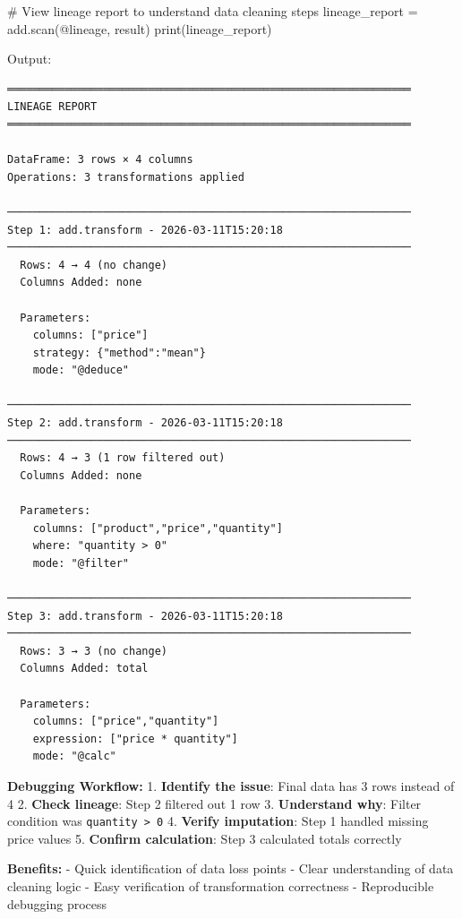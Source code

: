 \documentclass[
  letterpaper,
]{scrbook}
\newenvironment{Shaded}{\begin{snugshade}}{\end{snugshade}}
\newcommand{\BuiltInTok}[1]{\textcolor[rgb]{0.00,0.23,0.31}{#1}}
\newcommand{\CommentTok}[1]{\textcolor[rgb]{0.37,0.37,0.37}{#1}}
\newcommand{\NormalTok}[1]{\textcolor[rgb]{0.00,0.23,0.31}{#1}}
\newcommand{\OperatorTok}[1]{\textcolor[rgb]{0.37,0.37,0.37}{#1}}
\newcommand{\StringTok}[1]{\textcolor[rgb]{0.13,0.47,0.30}{#1}}
\begin{document}
\begin{Shaded}
\begin{Highlighting}[]
\CommentTok{\# View lineage report to understand data cleaning steps}
\NormalTok{lineage\_report }\OperatorTok{=}\NormalTok{ add.scan(}\StringTok{\textquotesingle{}@lineage\textquotesingle{}}\NormalTok{, result)}
\BuiltInTok{print}\NormalTok{(lineage\_report)}
\end{Highlighting}
\end{Shaded}

Output:

\begin{verbatim}
═══════════════════════════════════════════════════════════════
LINEAGE REPORT
═══════════════════════════════════════════════════════════════

DataFrame: 3 rows × 4 columns
Operations: 3 transformations applied

───────────────────────────────────────────────────────────────
Step 1: add.transform - 2026-03-11T15:20:18
───────────────────────────────────────────────────────────────
  Rows: 4 → 4 (no change)
  Columns Added: none
  
  Parameters:
    columns: ["price"]
    strategy: {"method":"mean"}
    mode: "@deduce"

───────────────────────────────────────────────────────────────
Step 2: add.transform - 2026-03-11T15:20:18
───────────────────────────────────────────────────────────────
  Rows: 4 → 3 (1 row filtered out)
  Columns Added: none
  
  Parameters:
    columns: ["product","price","quantity"]
    where: "quantity > 0"
    mode: "@filter"

───────────────────────────────────────────────────────────────
Step 3: add.transform - 2026-03-11T15:20:18
───────────────────────────────────────────────────────────────
  Rows: 3 → 3 (no change)
  Columns Added: total
  
  Parameters:
    columns: ["price","quantity"]
    expression: ["price * quantity"]
    mode: "@calc"
\end{verbatim}

\textbf{Debugging Workflow:} 1. \textbf{Identify the issue}: Final data
has 3 rows instead of 4 2. \textbf{Check lineage}: Step 2 filtered out 1
row 3. \textbf{Understand why}: Filter condition was
\texttt{quantity\ \textgreater{}\ 0} 4. \textbf{Verify imputation}: Step
1 handled missing price values 5. \textbf{Confirm calculation}: Step 3
calculated totals correctly

\textbf{Benefits:} - Quick identification of data loss points - Clear
understanding of data cleaning logic - Easy verification of
transformation correctness - Reproducible debugging process
\end{document}
